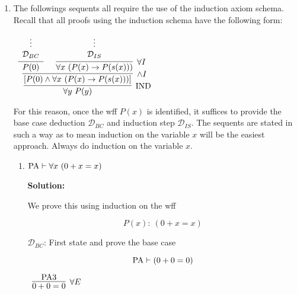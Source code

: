 \documentclass[11pt]{report}
\begin{document}
\begin{enumerate}
\begin{enumerate}
	\end{enumerate}

	\newpage
	\item 
	
	The followings sequents all require the use of the induction axiom schema. Recall that all proofs using the induction schema have the following form: 
	
		\begin{mdframed}
			\begin{center}
				$\begin{array}{c}
					\infer[\IND]{\forall y \ P(y)}
						{\infer[\land I]{[P(0) \land \forall x \ (P(x) \to P(s(x)))]}
							{\infer[]{P(0)}{\begin{array}{c} \vdots \\ \mathcal{D}_{BC}\end{array}}
							&
							\infer[\forall I]{\forall x \ (P(x) \to P(s(x)))}
								{\begin{array}{c} \vdots \\ \mathcal{D}_{IS}\end{array}}}}
				\end{array}$
			\end{center}
		\end{mdframed}

	For this reason, once the wff $P(x)$ is identified, it suffices to provide the base case deduction $\mathcal{D}_{BC}$ and induction step $\mathcal{D}_{IS}$. The sequents are stated in such a way as to mean induction on the variable $x$ will be the easiest approach. Always do induction on the variable $x$. 
	
	\begin{enumerate}
		\item $\text{PA} \vdash \forall x \ (0 + x = x)$
		
		{\bf Solution:} 

		We prove this using induction on the wff 

		$$ P(x) : \ (0 + x = x)$$

		$\mathcal{D}_{BC}$: First state and prove the base case 

		$$ \text{PA} \vdash (0 + 0 = 0)$$

		\begin{mdframed}
			\begin{center}
				$\begin{array}{c}
					\infer[\forall E]{0 + 0 = 0}
						{\PA 3}
				\end{array}$
			\end{center}
		\end{mdframed}


\end{enumerate}
\end{enumerate}
\end{document}
